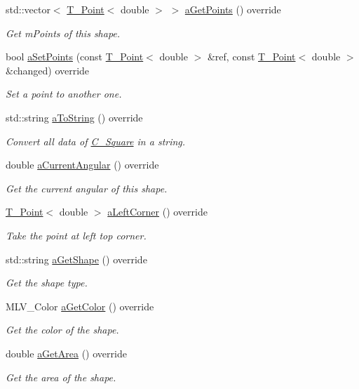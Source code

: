 \begin{DoxyCompactItemize}
std\+::vector$<$ \hyperlink{classT__Point}{T\+\_\+\+Point}$<$ double $>$ $>$ \hyperlink{classC__Square_aca738fec39149ed697f3d2413cd7cec2}{a\+Get\+Points} () override
\begin{DoxyCompactList}\small\item\em Get m\+Points of this shape. \end{DoxyCompactList}\item 
bool \hyperlink{classC__Square_a295a170686422b745587a250ebe08a5e}{a\+Set\+Points} (const \hyperlink{classT__Point}{T\+\_\+\+Point}$<$ double $>$ \&ref, const \hyperlink{classT__Point}{T\+\_\+\+Point}$<$ double $>$ \&changed) override
\begin{DoxyCompactList}\small\item\em Set a point to another one. \end{DoxyCompactList}\item 
std\+::string \hyperlink{classC__Square_ab2cada51b25cd35b9a79e461767e56f0}{a\+To\+String} () override
\begin{DoxyCompactList}\small\item\em Convert all data of \hyperlink{classC__Square}{C\+\_\+\+Square} in a string. \end{DoxyCompactList}\item 
double \hyperlink{classC__Square_ac7779503b305fda4147b735622c66f81}{a\+Current\+Angular} () override
\begin{DoxyCompactList}\small\item\em Get the current angular of this shape. \end{DoxyCompactList}\item 
\hyperlink{classT__Point}{T\+\_\+\+Point}$<$ double $>$ \hyperlink{classC__Square_a13e97bb379f1678636e3baf781c2a01b}{a\+Left\+Corner} () override
\begin{DoxyCompactList}\small\item\em Take the point at left top corner. \end{DoxyCompactList}\item 
std\+::string \hyperlink{classC__Square_a4919017d3750c1b8deb5f07d22069636}{a\+Get\+Shape} () override
\begin{DoxyCompactList}\small\item\em Get the shape type. \end{DoxyCompactList}\item 
M\+L\+V\+\_\+\+Color \hyperlink{classC__Square_a44b1e58b20cc98edc774a73742fec9a7}{a\+Get\+Color} () override
\begin{DoxyCompactList}\small\item\em Get the color of the shape. \end{DoxyCompactList}\item 
double \hyperlink{classC__Square_affd2be59872618d5d1955be360fb73e6}{a\+Get\+Area} () override
\begin{DoxyCompactList}\small\item\em Get the area of the shape. \end{DoxyCompactList}\end{DoxyCompactItemize}
